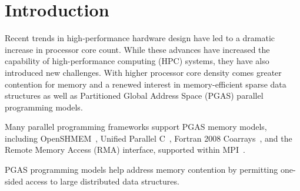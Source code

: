 \section{Introduction}


Recent trends in high-performance hardware design have led to a
dramatic increase in processor core count. While these advances have
increased the capability of high-performance computing (HPC) systems,
they have also introduced new challenges. With higher processor core
density comes greater contention for memory and a renewed interest
in memory-efficient sparse data structures as well as Partitioned 
Global Address Space (PGAS) parallel programming models.

Many parallel programming frameworks support PGAS memory models, 
including OpenSHMEM~\cite{openshmem-1.3}, Unified Parallel 
C~\cite{upc-13-spec}, Fortran 2008 Coarrays~\cite{reid:08}, and 
the Remote Memory Access (RMA) interface, supported within 
MPI~\cite{mpi-forum:15}.

PGAS programming models help address memory contention by permitting 
one-sided access to large distributed data structures. 








